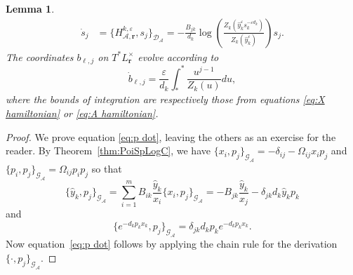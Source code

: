 \documentclass{amsart}
\newtheorem{lemma}[theorem]{Lemma}
\numberwithin{equation}{section}
\newcommand{\bfr}{{\boldsymbol{r}}}
\newcommand{\cA}{\mathcal{A}}
\newcommand{\cD}{\mathcal{D}}
\newcommand{\cG}{\mathcal{G}}
\begin{document}
\begin{lemma}
\begin{align}
    \label{eq:s dot}
    \dot s_j&=\{H_{\cA,\bfr}^{k,\varepsilon},s_j\}_{\cD_\cA}=-\frac{B_{jk}}{d_k}\log\left(\frac{Z_k\left(\hat y_k^\varepsilon s_k^{-\varepsilon d_k}\right)}{Z_k(\hat y_k^\varepsilon)}\right)s_j.
  \end{align}
  The coordinates $b_{\ell,j}$ on $T^*L^\times_\bfr$ evolve according to
  \begin{equation}
    \label{eq:b dot}
    \dot b_{\ell,j}=\frac{\varepsilon}{d_k}\int_*^* \frac{u^{j-1}}{Z_k(u)}du,
  \end{equation}
  where the bounds of integration are respectively those from equations \eqref{eq:X hamiltonian} or \eqref{eq:A hamiltonian}.
\end{lemma}
\begin{proof}
  We prove equation \eqref{eq:p dot}, leaving the others as an exercise for the reader.
  By Theorem~\ref{thm:PoiSpLogC}, we have $\{x_i,p_j\}_{\cG_\cA}=-\delta_{ij}-\Omega_{ij}x_ip_j$ and $\{p_i,p_j\}_{\cG_\cA}=\Omega_{ij}p_ip_j$ so that
  \[\{\hat y_k,p_j\}_{\cG_\cA}=\sum_{i=1}^m B_{ik}\frac{\hat y_k}{x_i}\{x_i,p_j\}_{\cG_\cA}=-B_{jk}\frac{\hat y_k}{x_j}-\delta_{jk}d_k\hat y_kp_k\]
  and
  \[\{e^{-d_kp_kx_k},p_j\}_{\cG_\cA}=\delta_{jk}d_kp_ke^{-d_kp_kx_k}.\]
  Now equation~\eqref{eq:p dot} follows by applying the chain rule for the derivation $\{\cdot,p_j\}_{\cG_\cA}$.
\end{proof}
\end{document}
